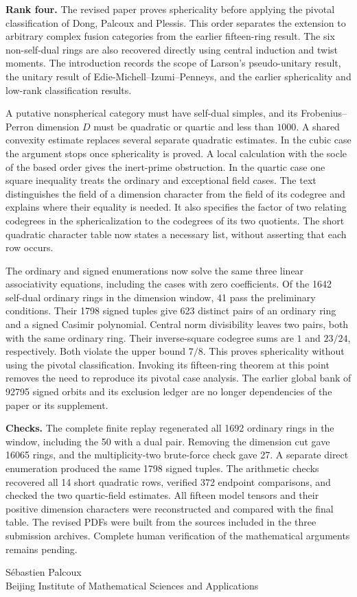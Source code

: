 \documentclass[11pt,a4paper]{article}
\begin{document}
\newpage
\textbf{Rank four.}
The revised paper proves sphericality before applying the pivotal
classification of Dong, Palcoux and Plessis. This order separates the
extension to arbitrary complex fusion categories from the earlier
fifteen-ring result. The six non-self-dual rings are also recovered directly
using central induction and twist moments. The introduction records the
scope of Larson's pseudo-unitary result, the unitary result of
Edie-Michell--Izumi--Penneys, and the earlier sphericality and
low-rank classification results.

A putative nonspherical category must have self-dual simples, and its
Frobenius--Perron dimension $D$ must be quadratic or quartic and less than
$1000$. A shared convexity estimate replaces several separate quadratic
estimates. In the cubic case the argument stops once sphericality is proved.
A local calculation with the socle of the based order gives the inert-prime
obstruction. In the quartic case one square inequality treats the
ordinary and exceptional field cases. The text distinguishes the field of
a dimension character from the field of its codegree and explains where
their equality is needed. It also specifies the factor of two relating
codegrees in the sphericalization to the codegrees of its two quotients.
The short quadratic character table now states a necessary list, without
asserting that each row occurs.

The ordinary and signed enumerations now solve the same three linear
associativity equations, including the cases with zero coefficients.
Of the 1642 self-dual ordinary rings in the dimension window, 41 pass
the preliminary conditions. Their 1798 signed tuples give 623 distinct
pairs of an ordinary ring and a signed Casimir polynomial. Central norm
divisibility leaves two pairs, both with the same ordinary ring.
Their inverse-square codegree sums are $1$ and $23/24$, respectively.
Both violate the upper bound $7/8$. This proves sphericality without
using the pivotal classification. Invoking its fifteen-ring theorem at
this point removes the need to reproduce its pivotal case analysis.
The earlier global bank of 92795 signed orbits and its exclusion ledger
are no longer dependencies of the paper or its supplement.

\textbf{Checks.}
The complete finite replay regenerated all 1692 ordinary rings in the
window, including the 50 with a dual pair. Removing the dimension cut
gave 16065 rings, and the multiplicity-two brute-force check gave 27.
A separate direct enumeration produced the same 1798 signed tuples.
The arithmetic checks recovered all 14 short quadratic rows, verified
372 endpoint comparisons, and checked the two quartic-field estimates.
All fifteen model tensors and their positive dimension characters were
reconstructed and compared with the final table. The revised PDFs were
built from the sources included in the three submission archives.
Complete human verification of the mathematical arguments remains pending.

\medskip
Sébastien Palcoux\\
Beijing Institute of Mathematical Sciences and Applications
\end{document}
